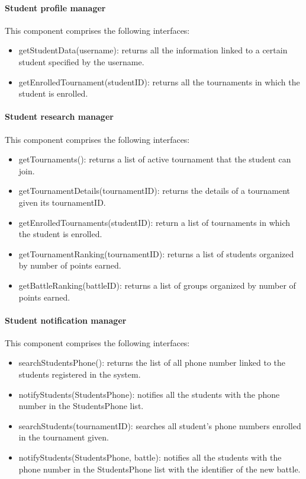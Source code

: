 \documentclass[12pt, a4paper]{report}
\begin{document}
    \paragraph*{Student profile manager}
    This component comprises the following interfaces: 
    \begin{itemize}
        \item getStudentData(username): returns all the information linked to a certain student specified by the username. 
        \item getEnrolledTournament(studentID): returns all the tournaments in which the student is enrolled. 
    \end{itemize}

    \paragraph*{Student research manager}
    This component comprises the following interfaces: 
    \begin{itemize}
        \item getTournaments(): returns a list of active tournament that the student can join. 
        \item getTournamentDetails(tournamentID): returns the details of a tournament given its tournamentID. 
        \item getEnrolledTournaments(studentID): return a list of tournaments in which the student is enrolled.
        \item getTournamentRanking(tournamentID): returns a list of students organized by number of points earned. 
        \item getBattleRanking(battleID): returns a list of groups organized by number of points earned. 
    \end{itemize}

    \paragraph*{Student notification manager}
    This component comprises the following interfaces: 
    \begin{itemize}
        \item searchStudentsPhone(): returns the list of all phone number linked to the students registered in the system. 
        \item notifyStudents(StudentsPhone): notifies all the students with the phone number in the StudentsPhone list. 
        \item searchStudents(tournamentID): searches all student's phone numbers enrolled in the tournament given.
        \item notifyStudents(StudentsPhone, battle): notifies all the students with the phone number in the StudentsPhone list with the identifier of the new battle. 
    \end{itemize}
\end{document}
